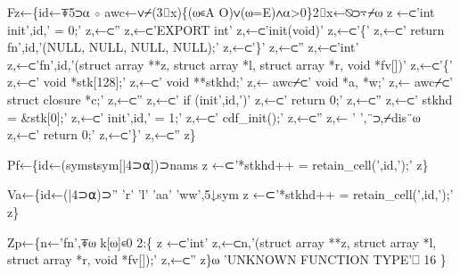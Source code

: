 \documentclass{article}%
\begin{document}
Fz←\{id←⍕5⊃⍺ ⋄ awc←∨⌿(3⌷x)\{(⍵∊A O)∨(⍵=E)∧⍺>0\}2⌷x←⍉⊃⍪⌿⍵
        z ←⊂'int init',id,' = 0;'
        z,←⊂''
        z,←⊂'EXPORT int'
        z,←⊂'init(void)'
        z,←⊂'\{'
        z,←⊂' return fn',id,'(NULL, NULL, NULL, NULL);'
        z,←⊂'\}'
        z,←⊂''
        z,←⊂'int'
        z,←⊂'fn',id,'(struct array **z, struct array *l, struct array *r, void *fv[])'
        z,←⊂'\{'
        z,←⊂'       void    *stk[128];'
        z,←⊂'       void    **stkhd;'
        z,← awc⌿⊂'        void    *a, *w;'
        z,← awc⌿⊂'        struct  closure *c;'
        z,←⊂''
        z,←⊂'       if (init',id,')'
        z,←⊂'               return 0;'
        z,←⊂''
        z,←⊂'       stkhd = &stk[0];'
        z,←⊂'       init',id,' = 1;'
        z,←⊂'       cdf_init();'
        z,←⊂''
        z,← ' ',¨⊃,⌿dis¨⍵
        z,←⊂'       return 0;'
        z,←⊂'\}'
        z,←⊂''
z\}

Pf←\{id←(syms⍳sym[|4⊃⍺])⊃nams
        z ←⊂'*stkhd++ = retain_cell(',id,');'
z\}

Va←\{id←(|4⊃⍺)⊃'' 'r' 'l' 'aa' 'ww',5↓sym
        z ←⊂'*stkhd++ = retain_cell(',id,');'
z\}

Zp←\{n←'fn',⍕⍵
        k[⍵]∊0 2:\{
                z ←⊂'int'
                z,←⊂n,'(struct array **z, struct array *l, struct array *r, void *fv[]);'
                z,←⊂''
        z\}⍵
        'UNKNOWN FUNCTION TYPE'⎕ 16
\}
\end{document}

